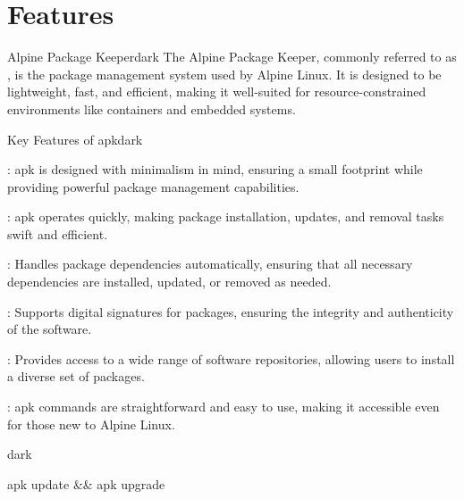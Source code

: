 \section{Features}
\label{Features}

\label{Alpine Package Keeper}
\begin{baseBoxThree}{Alpine Package Keeper}{dark}
    \bigskip
    The Alpine Package Keeper, commonly referred to as , is the package management system used by Alpine Linux.
    It is designed to be lightweight, fast, and efficient, making it well-suited for resource-constrained environments like containers and embedded systems.
    \bigskip
    \begin{baseBoxThree}{Key Features of apk}{dark}
        \smallskip
        \begin{posnexItemize} 
            \item[\sA] : apk is designed with minimalism in mind, ensuring a small footprint while providing powerful package management capabilities.
            \item[\sA] : apk operates quickly, making package installation, updates, and removal tasks swift and efficient.
            \item[\sA] : Handles package dependencies automatically, ensuring that all necessary dependencies are installed, updated, or removed as needed.
            \item[\sA] : Supports digital signatures for packages, ensuring the integrity and authenticity of the software.
            \item[\sA] : Provides access to a wide range of software repositories, allowing users to install a diverse set of packages.
            \item[\sA] : apk commands are straightforward and easy to use, making it accessible even for those new to Alpine Linux.
        \end{posnexItemize}
        \smallskip
    \end{baseBoxThree}
    \smallskip
    \begin{baseBoxThree}{}{dark}
        \begin{posnex}
apk update && apk upgrade
        \end{posnex}
    \end{baseBoxThree}
    \smallskip
\end{baseBoxThree}
